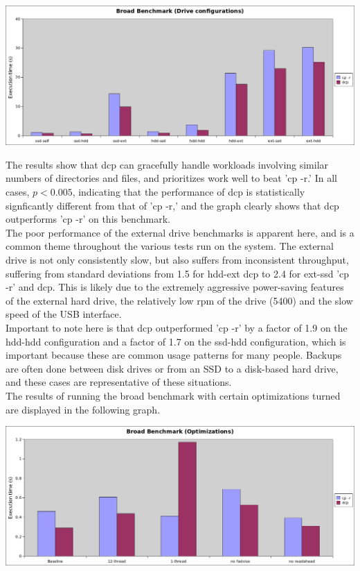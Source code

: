 \documentclass[12pt]{article}
\begin{document}
\includegraphics[width=500pt]{report/graphs/broad-manydisk.png}

\vspace{5mm}

The results show that dcp can gracefully handle workloads involving
similar numbers of directories and files, and prioritizes work
well to beat 'cp -r.' In all cases, $p < 0.005$, indicating that
the performance of dcp is statistically signficantly different from
that of 'cp -r,' and the graph clearly shows that dcp outperforms
'cp -r' on this benchmark. \\

The poor performance of the external
drive benchmarks is apparent here, and is a common theme throughout
the various tests run on the system. The external drive is not only
consistently slow, but also suffers from inconsistent throughput,
suffering from standard deviations from 1.5 for hdd-ext dcp
to 2.4 for ext-ssd 'cp -r' and dcp. This is likely due to the
extremely aggressive power-saving features of the external hard drive,
the relatively low rpm of the drive (5400) and the slow speed of the
USB interface. \\

Important to note here is that dcp outperformed 'cp -r' by a factor
of 1.9 on the hdd-hdd configuration and a factor of 1.7 on the
ssd-hdd configuration, which is important because these are common
usage patterns for many people. Backups are often done between disk drives
or from an SSD to a disk-based hard drive, and these cases are representative
of these situations. \\

The results of running the broad benchmark with certain optimizations turned
are displayed in the following graph.\\

\vspace{5mm}

\includegraphics[width=500pt]{report/graphs/broad-optimizations.png}
\end{document}
